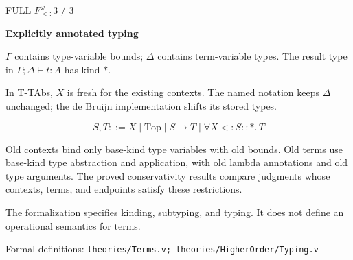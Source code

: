 \documentclass[11pt,border=12pt,multi=sheet]{standalone}
\newenvironment{sheet}{%
  \begin{minipage}{160mm}\color{ink}%
  \setlength{\parindent}{0pt}\setlength{\parskip}{5pt}%
  \setlength{\abovedisplayskip}{7pt}\setlength{\belowdisplayskip}{7pt}%
}{\end{minipage}}
\newcommand{\sheettitle}[2]{%
  {\sffamily\color{accent}\small FULL $F_{<:}^{\omega}$\hfill #1 / 3}\par
  {\sffamily\bfseries\fontsize{18}{22}\selectfont #2}\par
  \vspace{2pt}{\color{muted}\hrule height .35pt}\vspace{8pt}}
\newcommand{\blocktitle}[1]{\par\vspace{5pt}{\sffamily\bfseries #1}\par}
\newcommand{\note}[1]{{\small\color{muted}#1\par}}
\newcommand{\source}[1]{\vspace{6pt}{\color{muted}\hrule height .25pt}\vspace{4pt}%
  {\scriptsize\sffamily Formal definitions: \texttt{#1}\par}}
\newcommand{\Top}{\mathrm{Top}}
\newcommand{\All}[3]{\forall X<:#1::#2.\,#3}
\newcommand{\TAbs}[3]{\Lambda X<:#1::#2.\,#3}
\newcommand{\ki}[3]{#1\vdash #2::#3}
\newcommand{\su}[4]{#1\vdash #2<:#3::#4}
\newcommand{\ty}[4]{#1;#2\vdash #3:#4}
\newcommand{\bound}[2]{\Gamma,X<:#1::#2}
\begin{document}
\begin{sheet}
\sheettitle{3}{Explicitly annotated typing}
\note{$\Gamma$ contains type-variable bounds; $\Delta$ contains term-variable
types. The result type in $\ty{\Gamma}{\Delta}{t}{A}$ has kind $*$.}


\note{In T-TAbs, $X$ is fresh for the existing contexts. The named notation
keeps $\Delta$ unchanged; the de Bruijn implementation shifts its stored types.}

\blocktitle{The old fragment}
\[
S,T ::= X\mid\Top\mid S\to T\mid\All{S}{*}{T}
\]
\note{Old contexts bind only base-kind type variables with old bounds.
Old terms use base-kind type abstraction and application, with old lambda
annotations and old type arguments. The proved conservativity results
compare judgments whose contexts, terms, and endpoints satisfy these
restrictions.}
\note{The formalization specifies kinding, subtyping, and typing. It does
not define an operational semantics for terms.}
\source{theories/Terms.v; theories/HigherOrder/Typing.v}
\end{sheet}
\end{document}
